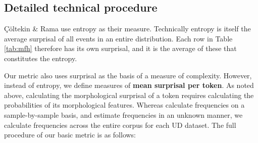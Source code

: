 \documentclass[USenglish]{article}
\begin{document}
\subsection{Detailed technical procedure}
\label{detailed_procedure}
Çöltekin \& Rama use entropy as their measure.
Technically entropy is itself the average surprisal of all events in an entire distribution.
Each row in Table \ref{tab:mfh} therefore has its own surprisal, and it is the average of these that constitutes the entropy.

Our metric also uses surprisal as the basis of a measure of complexity.
However, instead of entropy, we define measures of \textbf{mean surprisal per token}.
As noted above, calculating the morphological surprisal of a token requires calculating the probabilities of its morphological features.
Whereas \citet{ccoltekin2023complexity} calculate frequencies on a sample-by-sample basis, and \citet{SPROAT14.47} estimate frequencies in an unknown manner, we calculate frequencies across the entire corpus for each UD dataset.
The full procedure of our basic metric is as follows:
\end{document}
